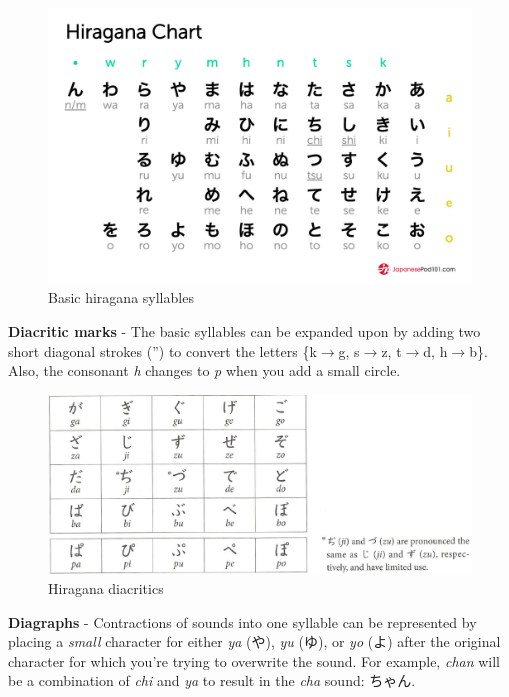 \documentclass{proc}
\begin{document}
{\begin{figure}[!ht]
    \includegraphics[scale=0.25]{res/hiragana_chart.jpg}
    \caption{Basic hiragana syllables}
\end{figure}

\par
\textbf{Diacritic marks} - The basic syllables can be expanded upon by adding two short diagonal strokes ('') to convert the letters \{k$\to$g, s$\to$z, t$\to$d, h$\to$b\}. Also, the consonant \textit{h} changes to \textit{p} when you add a small circle.

\begin{figure}[!ht]
    \includegraphics[scale=0.5]{res/hiragana_diacritics.jpg}
    \caption{Hiragana diacritics}
\end{figure}

\par
\textbf{Diagraphs} - Contractions of sounds into one syllable can be represented by placing a \textit{small} character for either \textit{ya} (や), \textit{yu} (ゆ), or \textit{yo} (よ) after the original character for which you're trying to overwrite the sound. For example, \textit{chan} will be a combination of \textit{chi} and \textit{ya} to result in the \textit{cha} sound: ちゃん.

}
\end{document}

